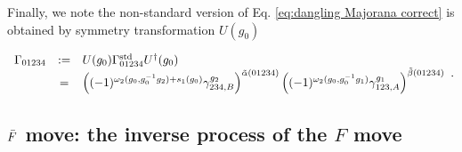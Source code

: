 \documentclass[%
 reprint,
 amsmath,amssymb,
 aps,
prb,
]{revtex4-2}
\begin{document}
Finally, we note the non-standard version of Eq. \eqref{eq:dangling Majorana correct} is obtained by symmetry transformation $U(g_0)$ 
\begin{widetext}
\begin{equation}
\begin{array}{ c c l }
\Gamma_{01234} & := & U(g_0) \Gamma_{01234}^{\mathrm{std}} U^{\dagger}(g_0)\\
& = & \left( (-1)^{\omega_2(g_0, g^{-1}_0 g_2) + s_1(g_0)} \gamma _{234,B}^{g_2} \right) ^{\tilde{\alpha}(01234)} \left( (-1)^{\omega_2(g_0, g^{-1}_0 g_1)} \gamma _{123,A}^{g_1} \right) ^{\tilde{\beta}(01234)}
\end{array} .
\end{equation}
\end{widetext}


\subsection{$\Bar{F}$ move: the inverse process of the $F$ move}
\end{document}
